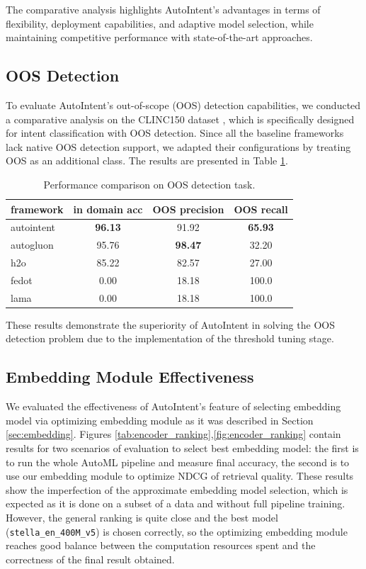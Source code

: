 The comparative analysis highlights AutoIntent's advantages in terms of flexibility, deployment capabilities, and adaptive model selection, while maintaining competitive performance with state-of-the-art approaches.

\subsection{OOS Detection}\label{sec:oos_detection}

To evaluate AutoIntent's out-of-scope (OOS) detection capabilities, we conducted a comparative analysis on the CLINC150 dataset \cite{clinc150}, which is specifically designed for intent classification with OOS detection. Since all the baseline frameworks lack native OOS detection support, we adapted their configurations by treating OOS as an additional class. The results are presented in Table \ref{tab:oos}.

\begin{table}[h]
\centering
\begin{tabular}{l|ccc}
\toprule
framework & in domain acc & OOS precision & OOS recall \\
\midrule
autointent & \textbf{96.13} & 91.92 & \textbf{65.93} \\
autogluon \cite{tang2024autogluonmultimodalautommsuperchargingmultimodal} & 95.76 & \textbf{98.47} & 32.20 \\
h2o \cite{ledell2020h2o} & 85.22 & 82.57 & 27.00 \\
fedot \cite{nikitin2021automated} & 0.00 & 18.18 & 100.0 \\
lama \cite{vakhrushev2022lightautomlautomlsolutionlarge} & 0.00 & 18.18 & 100.0 \\
\bottomrule
\end{tabular}
\caption{Performance comparison on OOS detection task.}
\label{tab:oos}
\end{table}

These results demonstrate the superiority of AutoIntent in solving the OOS detection problem due to the implementation of the threshold tuning stage.

\subsection{Embedding Module Effectiveness}

We evaluated the effectiveness of AutoIntent's feature of selecting embedding model via optimizing embedding module as it was described in Section \ref{sec:embedding}. Figures \ref{tab:encoder_ranking},\ref{fig:encoder_ranking} contain results for two scenarios of evaluation to select best embedding model: the first is to run the whole AutoML pipeline and measure final accuracy, the second is to use our embedding module to optimize NDCG of retrieval quality. These results show the imperfection of the approximate embedding model selection, which is expected as it is done on a subset of a data and without full pipeline training. However, the general ranking is quite close and the best model (\texttt{stella\_en\_400M\_v5}) is chosen correctly, so the optimizing embedding module reaches good balance between the computation resources spent and the correctness of the final result obtained.


